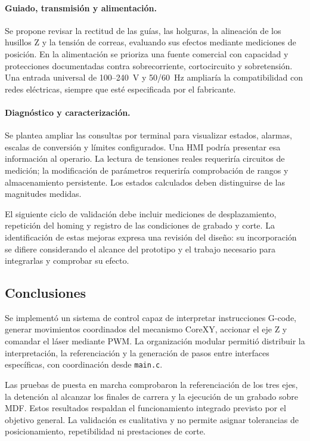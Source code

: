 \documentclass[blue,fullpaper]{ludusofficial}  %
\begin{document}
\paragraph{Guiado, transmisión y alimentación.}
Se propone revisar la rectitud de las guías, las holguras,
la alineación de los husillos Z y la tensión de correas,
evaluando sus efectos mediante mediciones de posición.
En la alimentación se prioriza una fuente comercial
con capacidad y protecciones documentadas contra
sobrecorriente, cortocircuito y sobretensión.
Una entrada universal de 100--240~V y 50/60~Hz
ampliaría la compatibilidad con redes eléctricas,
siempre que esté especificada por el fabricante.

\paragraph{Diagnóstico y caracterización.}
Se plantea ampliar las consultas por terminal para
visualizar estados, alarmas, escalas de conversión
y límites configurados. Una HMI podría presentar
esa información al operario. La lectura de tensiones
reales requeriría circuitos de medición; la modificación
de parámetros requeriría comprobación de rangos
y almacenamiento persistente. Los estados calculados
deben distinguirse de las magnitudes medidas.

El siguiente ciclo de validación debe incluir
mediciones de desplazamiento, repetición del homing
y registro de las condiciones de grabado y corte.
La identificación de estas mejoras expresa una revisión
del diseño: su incorporación se difiere considerando
el alcance del prototipo y el trabajo necesario
para integrarlas y comprobar su efecto.

\subsection{Conclusiones}
\label{subsec:conclusiones}

Se implementó un sistema de control capaz de interpretar
instrucciones G-code, generar movimientos coordinados
del mecanismo CoreXY, accionar el eje Z y comandar
el láser mediante PWM. La organización modular permitió
distribuir la interpretación, la referenciación y
la generación de pasos entre interfaces específicas,
con coordinación desde \texttt{main.c}.

Las pruebas de puesta en marcha comprobaron
la referenciación de los tres ejes, la detención
al alcanzar los finales de carrera y la ejecución
de un grabado sobre MDF. Estos resultados respaldan
el funcionamiento integrado previsto por el objetivo
general. La validación es cualitativa y no permite
asignar tolerancias de posicionamiento, repetibilidad
ni prestaciones de corte.
\end{document}
